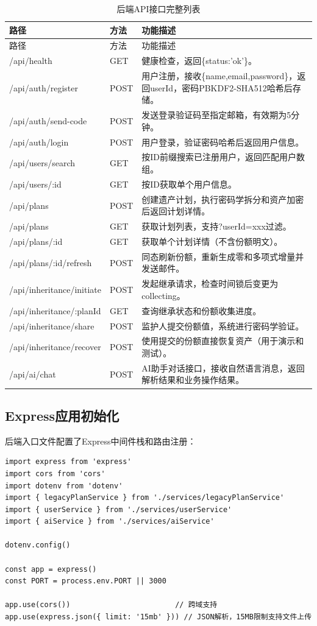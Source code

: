 \documentclass[UTF8,a4paper,zihao=-4,openany]{ctexrep}
\begin{document}
\setlength{\extrarowheight}{4pt}
\begin{longtable}{p{4.2cm}p{1.5cm}p{8.5cm}}
\caption{后端API接口完整列表}\\
\toprule
路径 & 方法 & 功能描述\\
\midrule
\endfirsthead
\toprule
路径 & 方法 & 功能描述\\
\midrule
\endhead
/api/health & GET & 健康检查，返回\{status:'ok'\}。\\
/api/auth/register & POST & 用户注册，接收\{name,email,password\}，返回userId，密码PBKDF2-SHA512哈希后存储。\\
/api/auth/send-code & POST & 发送登录验证码至指定邮箱，有效期为5分钟。\\
/api/auth/login & POST & 用户登录，验证密码哈希后返回用户信息。\\
/api/users/search & GET & 按ID前缀搜索已注册用户，返回匹配用户数组。\\
/api/users/:id & GET & 按ID获取单个用户信息。\\
/api/plans & POST & 创建遗产计划，执行密码学拆分和资产加密后返回计划详情。\\
/api/plans & GET & 获取计划列表，支持?userId=xxx过滤。\\
/api/plans/:id & GET & 获取单个计划详情（不含份额明文）。\\
/api/plans/:id/refresh & POST & 同态刷新份额，重新生成零和多项式增量并发送邮件。\\
/api/inheritance/initiate & POST & 发起继承请求，检查时间锁后变更为collecting。\\
/api/inheritance/:planId & GET & 查询继承状态和份额收集进度。\\
/api/inheritance/share & POST & 监护人提交份额值，系统进行密码学验证。\\
/api/inheritance/recover & POST & 使用提交的份额直接恢复资产（用于演示和测试）。\\
/api/ai/chat & POST & AI助手对话接口，接收自然语言消息，返回解析结果和业务操作结果。\\
\bottomrule
\end{longtable}

\subsection{Express应用初始化}

后端入口文件配置了Express中间件栈和路由注册：

\begin{lstlisting}[caption={Express应用初始化 (index.ts:1-14)}]
import express from 'express'
import cors from 'cors'
import dotenv from 'dotenv'
import { legacyPlanService } from './services/legacyPlanService'
import { userService } from './services/userService'
import { aiService } from './services/aiService'

dotenv.config()

const app = express()
const PORT = process.env.PORT || 3000

app.use(cors())                        // 跨域支持
app.use(express.json({ limit: '15mb' })) // JSON解析，15MB限制支持文件上传
\end{lstlisting}
\end{document}
